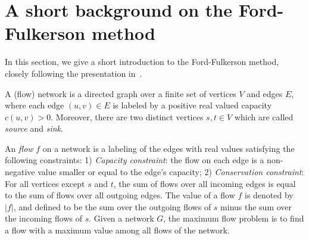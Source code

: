 \documentclass{llncs}
\begin{document}
\section{A short background on the Ford-Fulkerson method}\label{sec:background}
%       
%   
% 
%         
%   
%   
%   
%   
%   

In this section, we give a short introduction to the Ford-Fulkerson method, closely following the presentation in~\cite{CLRS09}.

% 

A (flow) network is a directed graph over a finite set of vertices $V$ and edges $E$, where each edge $(u,v)\in E$ is labeled by a positive real valued capacity $c(u,v)>0$.
Moreover, there are two distinct vertices $s,t\in V$ which are called \emph{source} and \emph{sink}. 

An \emph{flow} $f$ on a network is a labeling of the edges with real values satisfying the following constraints: 1) \emph{Capacity constraint}: the flow on each edge is a non-negative value smaller or equal to the edge's capacity; 2) \emph{Conservation constraint}: For all vertices except $s$ and $t$, the sum of flows over all incoming edges is equal to the sum of flows over all outgoing edges. 
The value of a flow $f$ is denoted by $|f|$, and defined to be the sum over the outgoing flows of $s$ minus the sum over the incoming flows of $s$.
Given a network $G$, the maximum flow problem is to find a flow with a maximum value among all flows of the network. 
\end{document}
